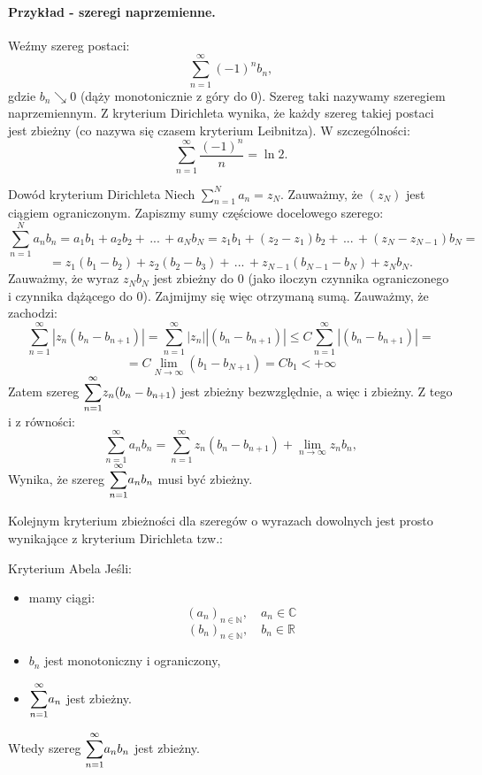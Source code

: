 \documentclass{article}
\newcommand{\R}{\mathbb{R}}
\newcommand{\N}{\mathbb{N}}
\newcommand{\C}{\mathbb{C}}
\newcommand{\oo}{\infty}
\begin{document}
    \paragraph{Przykład - szeregi naprzemienne.} Weźmy szereg postaci:
    \[\sum_{n=1}^{\oo} (-1)^n b_n,\]
    gdzie $b_n \searrow 0$ (dąży monotonicznie z góry do 0). Szereg taki nazywamy szeregiem naprzemiennym. Z kryterium Dirichleta wynika, że każdy szereg takiej postaci jest zbieżny (co nazywa się czasem kryterium Leibnitza). W szczególności:
    \[\sum_{n=1}^{\oo} \frac{(-1)^n}{n} = \ln 2.\]
    \begin{dow}{Dowód kryterium Dirichleta}
        Niech $\sum_{n=1}^{N} a_n = z_N$. Zauważmy, że $(z_N)$ jest ciągiem ograniczonym. Zapiszmy sumy częściowe docelowego szerego:
        \[\sum_{n=1}^{N} a_n b_n = a_1 b_1 + a_2 b_2 + \, ... \, + a_N b_N = z_1 b_1 + (z_2 - z_1) b_2 + \, ... \, +  (z_N - z_{N-1}) b_N = \]
        \[ = z_1 (b_1 - b_2) + z_2 (b_2 - b_3) + \, ... \, + z_{N-1} (b_{N-1} - b_N) + z_N b_N.\]
        Zauważmy, że wyraz $z_N b_N$ jest zbieżny do 0 (jako iloczyn czynnika ograniczonego i czynnika dążącego do 0).
        Zajmijmy się więc otrzymaną sumą. Zauważmy, że zachodzi:
        \[\sum_{n=1}^{\oo} | z_n (b_n - b_{n+1} )| = \sum_{n=1}^{\oo} | z_n| | (b_n - b_{n+1} )| \leqslant  C \sum_{n=1}^{\oo} | (b_n - b_{n+1} )| =\]
        \[= C \lim_{N\to \oo} (b_1 - b_{N+1}) = C b_1 < + \oo\]
        Zatem szereg $\mathlarger{\sum}_{n=1}^{\oo} z_n ( b_n - b_{n+1})$ jest zbieżny bezwzględnie, a więc i zbieżny.
        Z tego i z równości:
        \[\sum_{n=1}^{\oo} a_n b_n = \sum_{n=1}^{\oo} z_n ( b_n - b_{n+1}) + \lim _{n \to \oo} z_n b_n, \]
        Wynika, że szereg $\mathlarger{\sum}_{n=1}^{\oo} a_n b_n$ musi być zbieżny.  
    \end{dow}
    Kolejnym kryterium zbieżności dla szeregów o wyrazach dowolnych jest prosto wynikające z kryterium Dirichleta tzw.:
    \begin{twier}{Kryterium Abela}
        Jeśli:
        \begin{itemize}
            \item mamy ciągi: 
            \[(a_n)_{n\in \N}, \quad a_n \in \C \]
            \[(b_n)_{n\in \N}, \quad b_n \in \R\]
            \item $b_n$ jest monotoniczny i ograniczony,
            \item $\mathlarger{\sum}_{n=1}^{\oo} a_n$ jest zbieżny.
        \end{itemize}
        Wtedy szereg $\mathlarger{\sum}_{n=1}^{\oo} a_n b_n$ jest zbieżny.
    \end{twier}
\end{document}
